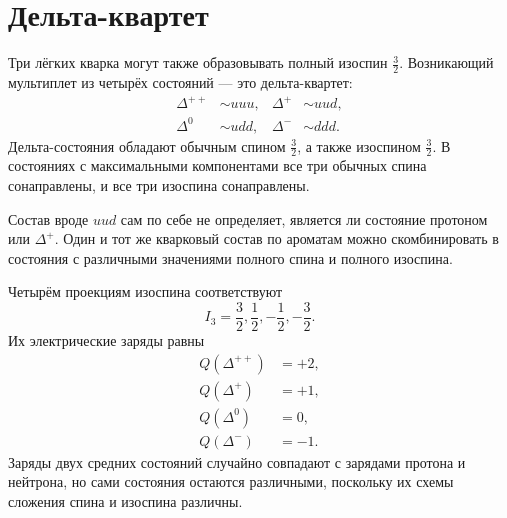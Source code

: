 \section{Дельта-квартет}

Три лёгких кварка могут также образовывать полный изоспин \(\tfrac32\). Возникающий мультиплет из четырёх состояний — это дельта-квартет:
\begin{equation}
\begin{aligned}
\Delta^{++}&\sim uuu,
&
\Delta^{+}&\sim uud,
\\
\Delta^{0}&\sim udd,
&
\Delta^{-}&\sim ddd.
\end{aligned}
\end{equation}
Дельта-состояния обладают обычным спином \(\tfrac32\), а также изоспином \(\tfrac32\). В состояниях с максимальными компонентами все три обычных спина сонаправлены, и все три изоспина сонаправлены.

Состав вроде \(uud\) сам по себе не определяет, является ли состояние протоном или \(\Delta^+\). Один и тот же кварковый состав по ароматам можно скомбинировать в состояния с различными значениями полного спина и полного изоспина.

\begin{classroomqa}
\end{classroomqa}

\begin{classroomqa}
\end{classroomqa}

Четырём проекциям изоспина соответствуют
\begin{equation}
I_3=\frac32,\frac12,-\frac12,-\frac32.
\end{equation}
Их электрические заряды равны
\begin{align}
Q(\Delta^{++})&=+2,\\
Q(\Delta^{+})&=+1,\\
Q(\Delta^{0})&=0,\\
Q(\Delta^{-})&=-1.
\end{align}
Заряды двух средних состояний случайно совпадают с зарядами протона и нейтрона, но сами состояния остаются различными, поскольку их схемы сложения спина и изоспина различны.

